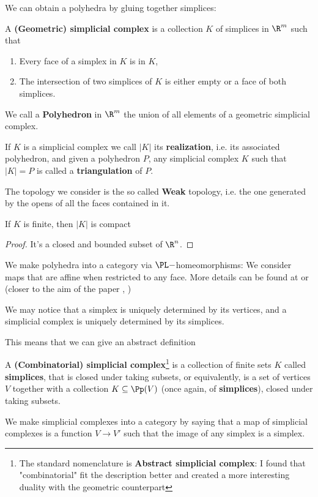We can obtain a polyhedra by gluing together simplices: 
\begin{definition}[Polyhedron]\hfill 

    A \textbf{(Geometric) simplicial complex} is a collection $K$ of simplices in $\R^m$ such that 
    \begin{enumerate}
        \item Every face of a simplex in $K$ is in $K$, 
        \item The intersection of two simplices of $K$ is either empty or a face of both simplices.
    \end{enumerate}
    
    We call a \textbf{Polyhedron} in $\R^m$ the union of all elements of a geometric simplicial complex.

    If $K$ is a simplicial complex we call $|K|$ its \textbf{realization}, i.e. its associated polyhedron,
    and given a polyhedron $P$, any simplicial complex $K$ such that $|K|=P$ is called a \textbf{triangulation} of $P$.

    The topology we consider is the so called \textbf{Weak} topology, i.e. the one generated by the opens of all the faces contained
    in it.
\end{definition}

\begin{lemma}

    If $K$ is finite, then $|K|$ is compact
\end{lemma}
\begin{proof}
    It's a closed and bounded subset of $\R^n$.
\end{proof}

We make polyhedra into a category via $\PL-$homeomorphisms: We consider maps that are affine when restricted to any face.
More details can be found at \cite{PLTopology} or (closer to the aim of the paper \cite{DBLP}, \cite{TENCATE})

We may notice that a simplex is uniquely determined by its vertices, and a simplicial complex is uniquely determined 
by its simplices.

This means that we can give an abstract definition
\begin{definition}\hfill 

    A \textbf{(Combinatorial) simplicial complex}\footnote{The standard nomenclature is 
    \textbf{Abstract simplicial complex}: I found that "combinatorial" fit the description better and created 
    a more interesting duality with the geometric counterpart} is a collection of finite sets $K$ called \textbf{simplices}, that is closed under taking subsets, or 
    equivalently, is a set of vertices $V$ together with a collection $K\subseteq \Pp(V)$ (once again, of \textbf{simplices}), closed under taking subsets.   

    We make simplicial complexes into a category by saying that a map of simplicial complexes is a function $V\to V'$ such that the image of any simplex is a simplex.
\end{definition}

